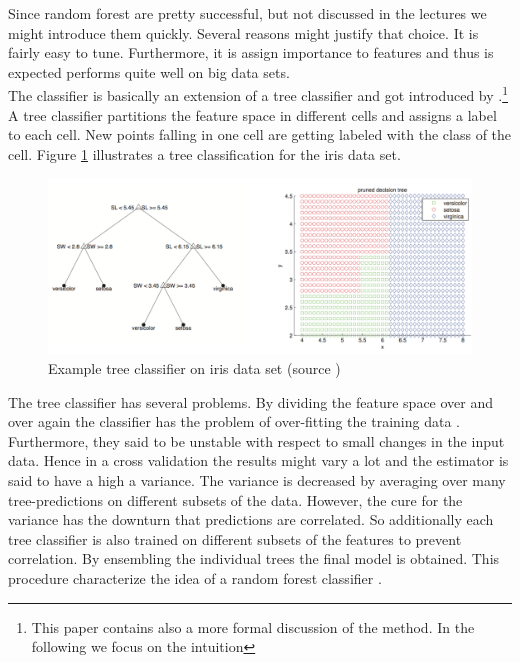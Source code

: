 \documentclass[12pt,a4paper,bibliography=totocnumbered,listof=totocnumbered]{scrartcl}
\begin{document}
Since random forest are pretty successful, but not discussed in the lectures we might introduce them quickly. Several reasons might justify that choice. It is fairly easy to tune. Furthermore, it is assign importance to features and thus is expected performs quite well on big data sets. \\
The classifier is basically an extension of a tree classifier and got introduced by \cite{Breiman2001}.\footnote{This paper contains also a more formal discussion of the method. In the following we focus on the intuition} A tree classifier partitions the feature space in different cells and assigns a label to each cell. New points falling in one cell are getting labeled with the class of the cell. Figure \ref{fig:fig2} illustrates a  tree classification for the iris data set.

\begin{figure}[H]
	\centering
	\small
	\includegraphics[width=\textwidth]{Pictures/tree.png}
	\caption{Example tree classifier on iris data set (source \cite[page 550]{Murphy2012}) }
	\label{fig:fig2}
\end{figure}

The tree classifier has several problems.  By dividing the feature space over and over again the classifier has the problem of over-fitting the training data \cite[page 360 et. seqq. ]{Wasserman2004}. Furthermore, they said to be unstable with respect to small changes in the input data. Hence in a cross validation the results might vary a lot and the estimator is said to have a high a variance. The variance is decreased by averaging over many tree-predictions on different subsets of the data. However, the cure for the variance has the downturn that predictions are correlated. So additionally each tree classifier is also trained on different subsets of the features to prevent correlation. By ensembling the individual trees the final model is obtained. This procedure characterize the idea of a random forest classifier \cite[page 550 et. seqq.]{Murphy2012}.
\end{document}
